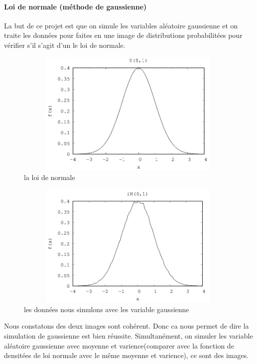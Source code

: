 \documentclass[]{article}
\let\oldparagraph\paragraph
\renewcommand{\paragraph}[1]{\oldparagraph{#1}\mbox{}}
\begin{document}
\hypertarget{header-n521}{%
\paragraph{Loi de normale (méthode de gaussienne)}\label{header-n521}}

La but de ce projet est que on simule les variables aléatoire gaussienne
et on traite les données pour faites en une image de distributions
probabilitées pour vérifier s'il s'agit d'un le loi de normale. \\
\begin{figure}
	\centering
	\includegraphics[height=6cm,width=11cm]{images/N01.png}
	\caption{la loi de normale}
	\label{fig3}
\end{figure}
\begin{figure}
	\centering
	\includegraphics[height=6cm,width=11cm]{images/iN01.png}
	\caption{les données nous simulons avec les variable gaussienne}
	\label{fig4}
\end{figure}

Nous constatons des deux images sont cohérent. Donc ca nous permet de
dire la simulation de gaussienne est bien réussite. Simultanément, on
simuler les variable aléatoire gaussienne avec moyenne et
varience(comparer avec la fonction de densitées de loi normale avec le
même moyenne et varience), ce sont des images.\\
\end{document}
